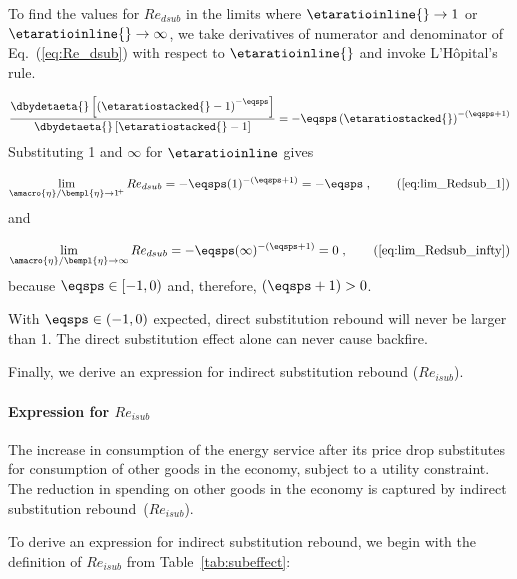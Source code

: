 To find the values for $Re_{dsub}$ in the limits where $\etaratioinline{} \to 1$ or 
$\etaratioinline{} \to \infty$, we take derivatives of numerator and denominator
of Eq.~(\ref{eq:Re_dsub}) with respect to $\etaratioinline{}$ and invoke L'H\^{o}pital's rule.

\begin{equation}
  \frac{\dbydetaeta{}\left[ \left( \etaratiostacked{} - 1 \right)^{-\eqsps}  \right]}
           {\dbydetaeta{}\left[ \etaratiostacked{} - 1\right]}
    = -\eqsps \left( \etaratiostacked{} \right)^{-(\eqsps + 1)}
\end{equation}
%
Substituting 1 and $\infty$ for $\etaratioinline$ gives

\begin{equation}
  \lim_{\amacro{\eta}/\bempl{\eta} \to 1^{\!+}} Re_{dsub} 
    = -\eqsps ( 1 )^{-(\eqsps + 1)}
    = -\eqsps \; ,                               \tag{\ref{eq:lim_Redsub_1}}
\end{equation}
%
and

\begin{equation}
  \lim_{\amacro{\eta}/\bempl{\eta} \to \infty} Re_{dsub} 
    = -\eqsps ( \infty )^{-(\eqsps + 1)}
    = 0 \; ,                                              \tag{\ref{eq:lim_Redsub_infty}}
\end{equation}
%
because $\eqsps \in [-1, 0)$ and, therefore, $(\eqsps + 1) > 0$.

With $\eqsps \in (-1, 0)$ expected,
direct substitution rebound will never be larger than 1.
The direct substitution effect alone
can never cause backfire. 

Finally, we derive an expression for indirect substitution rebound ($Re_{isub}$).


\paragraph{Expression for $Re_{isub}$}
\label{sec:Re_isub}

The increase in consumption of the energy service after its price drop
substitutes for consumption of other goods in the economy,
subject to a utility constraint.
The reduction in spending on other goods in the economy
is captured by indirect substitution rebound~($Re_{isub}$).

To derive an expression for indirect substitution rebound,
we begin with the definition of $Re_{isub}$
from Table~\ref{tab:subeffect}:

